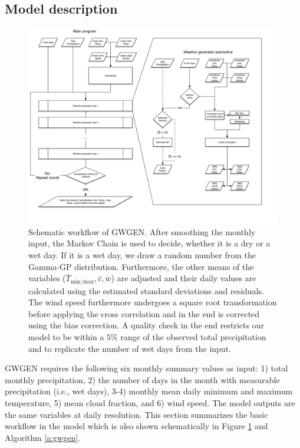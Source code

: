 \documentclass[
11pt, %
english, %
singlespacing, %
headsepline, %
]{MastersDoctoralThesis} %
\begin{document}
\begin{NoHyper}
\begin{refsection}
\section{Model description} \label{sec:model}
\begin{figure}
	\includegraphics[width=\linewidth]{gwgen-figures/f01.pdf}
	\caption[Schematic workflow of GWGEN]{Schematic workflow of GWGEN. After smoothing the monthly input, the Markov Chain is used to decide, whether it is a dry or a wet day. If it is a wet day, we draw a random number from the Gamma-GP distribution. Furthermore, the other means of the variables ($\bar{T}_\mathrm{min/max}, \bar{c}, \bar{w}$) are adjusted and their daily values are calculated using the estimated standard deviations and residuals. The wind speed furthermore undergoes a square root transformation before applying the cross correlation and in the end is corrected using the bias correction. A quality check in the end restricts our model to be within a $5\%$ range of the observed total precipitation and to replicate the number of wet days from the input.}
	\label{fig:schema}
\end{figure}
GWGEN requires the following six monthly summary values as input: 1) total monthly precipitation, 2) the number of days in the month with measurable precipitation (i.e., wet days), 3-4) monthly mean daily minimum and maximum temperature, 5) mean cloud fraction, and 6) wind speed. The model outputs are the same variables at daily resolution. This section summarizes the basic workflow in the model which is also shown schematically in Figure \ref{fig:schema} and Algorithm \autoref{a:gwgen}.


\end{refsection}
\end{NoHyper}
\end{document}
